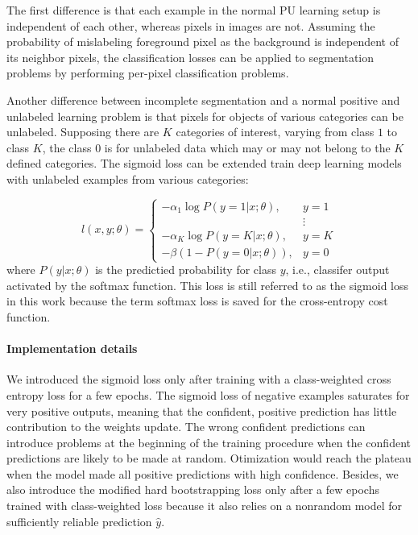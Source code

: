 The first difference is that each example in the normal PU learning setup is independent of each other, whereas pixels in images are not.
Assuming the probability of mislabeling foreground pixel as the background is independent of its neighbor pixels, the classification losses can be applied to segmentation problems by performing per-pixel classification problems.

Another difference between incomplete segmentation and a normal positive and unlabeled learning problem is that pixels for objects of various categories can be unlabeled.
Supposing there are $K$ categories of interest, varying from class $1$ to class $K$, the class $0$ is for unlabeled data which may or may not belong to the $K$ defined categories.
The sigmoid loss can be extended train deep learning models with unlabeled examples from various categories:

\[
  l(x, y; \theta) =
    \begin{cases}
      - \alpha_1 \log P(y=1 \vert x; \theta), & y = 1 \\
                                              & \vdots \\
      - \alpha_K \log P(y=K \vert x; \theta), & y = K \\
      - \beta (1 - P(y=0 \vert x; \theta)), & y = 0
    \end{cases}
\]
where $P(y \vert x; \theta)$ is the predictied probability for class $y$, i.e., classifer output activated by the softmax function.
This loss is still referred to as the sigmoid loss in this work because the term softmax loss is saved for the cross-entropy cost function.


\paragraph{Implementation details}
We introduced the sigmoid loss only after training with a class-weighted cross entropy loss for a few epochs.
The sigmoid loss of negative examples saturates for very positive outputs, meaning that the confident, positive prediction has little contribution to the weights update.
The wrong confident predictions can introduce problems at the beginning of the training procedure when the confident predictions are likely to be made at random.
Otimization would reach the plateau when the model made all positive predictions with high confidence.
Besides, we also introduce the modified hard bootstrapping loss only after a few epochs trained with class-weighted loss because it also relies on a nonrandom model for sufficiently reliable prediction $\hat{y}$.


